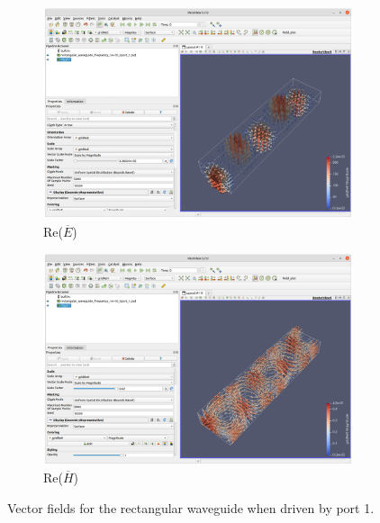 \documentclass[titlepage]{article}
\renewcommand\_{\textunderscore\linebreak[1]}
\begin{document}
\begin{itemize}
\begin{figure}[H]
  \centering
  \begin{subfigure}{0.73\textwidth}
     \includegraphics[width=\linewidth]{../tutorials/OpenParEM3D/rectangular_waveguide/screenshots/ReE} 
     \caption{Re($\overline{E}$)}
  \end{subfigure}
  \par\bigskip
  \begin{subfigure}{0.73\textwidth}
     \includegraphics[width=\linewidth]{../tutorials/OpenParEM3D/rectangular_waveguide/screenshots/ReH}
     \caption{Re($\overline{H}$)}
  \end{subfigure}
  \caption{Vector fields for the rectangular waveguide when driven by port 1.}
  \label{fig:fields}
\end{figure}

\end{itemize}
\end{document}
